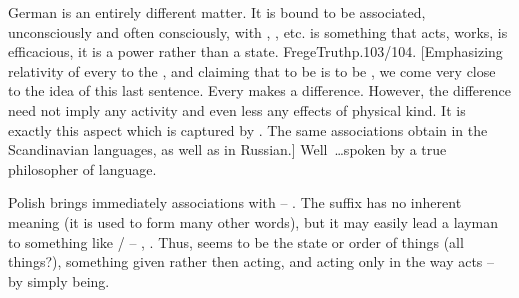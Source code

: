 German  is an entirely different matter. It is bound to be
associated, unconsciously and often consciously, with , ,
etc.  is something that acts, works, is efficacious, it is a
power rather than a state.  \citet{The world of the real is a world in which
  this acts on that, changes it and again experiences reactions itself and is
  changed by them. [...] What value could there be for us in the eternally
  unchangeable which could neither undergo effects nor have effects on us?
  Something entirely and in every respect inactive would be unreal and
  non-existent for us.}{FregeTruth}{p.103/104. [Emphasizing relativity of every
   to the , and claiming that to be
  is to be , we come very close to the idea of this last
  sentence. Every  makes a difference. However, the difference
  need not imply any activity and even less any effects of physical kind. It is
  exactly this aspect which is captured by . The same
  associations obtain in the Scandinavian languages, as well as in Russian.]} Well~\ldots spoken by a true philosopher of language.

Polish  brings immediately associations with
 -- .  The suffix  has no inherent
meaning (it is used to form many other words), but it may easily lead a layman
to something like / -- ,
.  Thus,  seems to be the state or order of things
(all things?), something given rather then acting, and acting only in the way
 acts -- by simply being.


